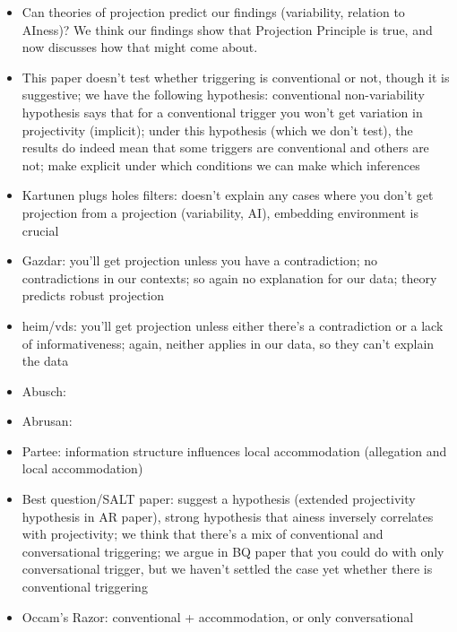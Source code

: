 \documentclass[11pt,fleqn]{article}
\newcommand{\6}{\mbox{$[\hspace*{-.6mm}[$}}
\newcommand{\9}{\mbox{$]\hspace*{-.6mm}]$}}
\begin{document}
\begin{itemize}

\item Can theories of projection predict our findings (variability, relation to AIness)? We think our findings show that Projection Principle is true, and now discusses how that might come about.

\item This paper doesn't test whether triggering is conventional or not, though it is suggestive; we have the following hypothesis: conventional non-variability hypothesis says that for a conventional trigger you won't get variation in projectivity (implicit); under this hypothesis (which we don't test), the results do indeed mean that some triggers are conventional and others are not; make explicit under which conditions we can make which inferences


\item Kartunen plugs holes filters: doesn't explain any cases where you don't get projection from a projection (variability, AI), embedding environment is crucial

\item Gazdar: you'll get projection unless you have a contradiction; no contradictions in our contexts; so again no explanation for our data; theory predicts robust projection

\item heim/vds: you'll get projection unless either there's a contradiction or a lack of informativeness; again, neither applies in our data, so they can't explain the data

\item Abusch:

\item Abrusan: 

\item Partee: information structure influences local accommodation (allegation and local accommodation)

\item Best question/SALT paper: suggest a hypothesis (extended projectivity hypothesis in AR paper), strong hypothesis that ainess inversely correlates with projectivity; we think that there's a mix of conventional and conversational triggering; we argue in BQ paper that you could do with only conversational trigger, but we haven't settled the case yet whether there is conventional triggering

\item Occam's Razor: conventional + accommodation, or only conversational


\end{itemize}
\end{document}
